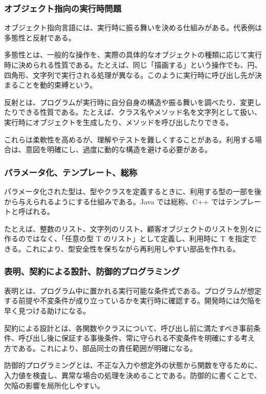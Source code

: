\documentclass[a4paper,11pt]{ltjsarticle}
\numberwithin{figure}{section}
\numberwithin{table}{section}
\begin{document}
\subsubsection{オブジェクト指向の実行時問題}

オブジェクト指向言語には、実行時に振る舞いを決める仕組みがある。代表例は多態性と反射である。

多態性とは、一般的な操作を、実際の具体的なオブジェクトの種類に応じて実行時に決められる性質である。たとえば、同じ「描画する」という操作でも、円、四角形、文字列で実行される処理が異なる。このように実行時に呼び出し先が決まることを動的束縛という。

反射とは、プログラムが実行時に自分自身の構造や振る舞いを調べたり、変更したりできる性質である。たとえば、クラス名やメソッド名を文字列として扱い、実行時にオブジェクトを生成したり、メソッドを呼び出したりできる。

これらは柔軟性を高めるが、理解やテストを難しくすることがある。利用する場合は、意図を明確にし、過度に動的な構造を避ける必要がある。

\subsubsection{パラメータ化、テンプレート、総称}

パラメータ化された型は、型やクラスを定義するときに、利用する型の一部を後から与えられるようにする仕組みである。Java では総称、C++ ではテンプレートと呼ばれる。

たとえば、整数のリスト、文字列のリスト、顧客オブジェクトのリストを別々に作るのではなく、「任意の型 T のリスト」として定義し、利用時に T を指定できる。これにより、型安全性を保ちながら再利用しやすい部品を作れる。

\subsubsection{表明、契約による設計、防御的プログラミング}

表明とは、プログラム中に置かれる実行可能な条件式である。プログラムが想定する前提や不変条件が成り立っているかを実行時に確認する。開発時には欠陥を早く見つける助けになる。

契約による設計とは、各関数やクラスについて、呼び出し前に満たすべき事前条件、呼び出し後に保証する事後条件、常に守られる不変条件を明確にする考え方である。これにより、部品同士の責任範囲が明確になる。

防御的プログラミングとは、不正な入力や想定外の状態から関数を守るために、入力値を検査し、異常な場合の処理を決めることである。防御的に書くことで、欠陥の影響を局所化しやすい。
\end{document}
